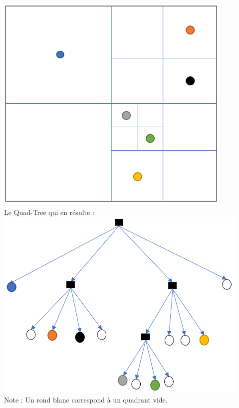 \begin{Exercice}[10 minutes]
\begin{solution}
    \includegraphics[]{Solutions/Quad-Tree 3 solution 1.PNG}\\
    
    Le Quad-Tree qui en résulte :\\
    
    \includegraphics[]{Solutions/Quad-Tree 3 solution 2.PNG}\\
    
    Note : Un rond blanc correspond à un quadrant vide.
    
\end{solution}
\end{Exercice}



